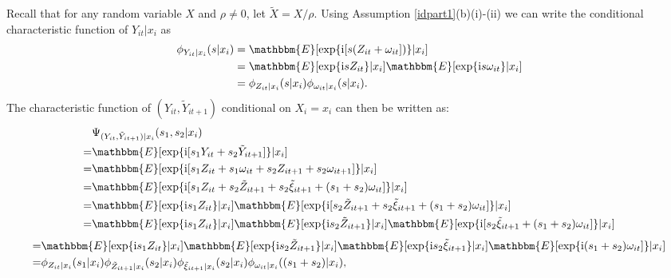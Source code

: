 \documentclass[12pt]{article}
\begin{document}
\begin{appendices}
Recall that for any random variable $X$ and $\rho\neq 0$, let $\tilde{X}=X/\rho$. Using Assumption \ref{idpart1}(b)(i)-(ii) we can write the conditional characteristic function of $Y_{it}|x_{i}$ as
\begin{equation} \label{repchar1}
\begin{split}
\phi_{Y_{it}|x_{i}}(s|x_{i})&=\mathbbm{E}[\exp\{\mathrm{i}[s(Z_{it}+\omega_{it}])\}|x_{i}]\\
&=\mathbbm{E}[\exp\{\mathrm{i}sZ_{it}\}|x_{i}]\mathbbm{E}[\exp\{\mathrm{i}s\omega_{it}\}|x_{i}]\\
&=\phi_{Z_{it}|x_{i}}(s|x_{i})\phi_{\omega_{it}|x_{i}}(s|x_{i}).
\end{split}
\end{equation}
The characteristic function of $(Y_{it}, \tilde{Y}_{it+1})$ conditional on $X_{i}=x_{i}$ can then be written as:
\begin{equation*} \label{jointchar}
\begin{split}
&\Psi_{(Y_{it}, \tilde{Y}_{it+1})|x_{i}}(s_{1}, s_{2}|x_{i})\\
=&\mathbbm{E}[\exp\{\mathrm{i}[s_{1}Y_{it}+s_{2}\tilde{Y}_{it+1}]\}|x_{i}]\\
=&\mathbbm{E}[\exp\{\mathrm{i}[s_{1}Z_{it}+s_{1}\omega_{it}+s_{2}Z_{it+1}+s_{2}\omega_{it+1}]\}|x_{i}]\\
=&\mathbbm{E}[\exp\{\mathrm{i}[s_{1}Z_{it}+s_{2}\tilde{Z}_{it+1}+s_{2}\tilde{\xi}_{it+1}+(s_{1}+s_{2})\omega_{it}]\}|x_{i}]\\
=&\mathbbm{E}[\exp\{\mathrm{i}s_{1}Z_{it}\}|x_{i}]\mathbbm{E}[\exp\{\mathrm{i}[s_{2}\tilde{Z}_{it+1}+s_{2}\tilde{\xi}_{it+1}+(s_{1}+s_{2})\omega_{it}]\}|x_{i}]\\
=&\mathbbm{E}[\exp\{\mathrm{i}s_{1}Z_{it}\}|x_{i}]\mathbbm{E}[\exp\{\mathrm{i}s_{2}\tilde{Z}_{it+1}\}|x_{i}]\mathbbm{E}[\exp\{\mathrm{i}[s_{2}\tilde{\xi}_{it+1}+(s_{1}+s_{2})\omega_{it}]\}|x_{i}]
\end{split}
\end{equation*}
\begin{equation}
\begin{split}
=&\mathbbm{E}[\exp\{\mathrm{i}s_{1}Z_{it}\}|x_{i}]\mathbbm{E}[\exp\{\mathrm{i}s_{2}\tilde{Z}_{it+1}\}|x_{i}]\mathbbm{E}[\exp\{\mathrm{i}s_{2}\tilde{\xi}_{it+1}\}|x_{i}]\mathbbm{E}[\exp\{\mathrm{i}(s_{1}+s_{2})\omega_{it}]\}|x_{i}]\\
=&\phi_{Z_{it}|x_{i}}(s_{1}|x_{i})\phi_{\tilde{Z}_{it+1}|x_{i}}(s_{2}|x_{i})\phi_{\tilde{\xi}_{it+1}|x_{i}}(s_{2}|x_{i})\phi_{\omega_{it}|x_{i}}((s_{1}+s_{2})|x_{i}),

\end{split}
\end{equation}
\end{appendices}
\end{document}
